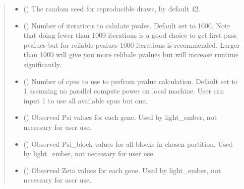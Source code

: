 \documentclass[letterpaper,10pt,english]{sphinxmanual}
\begin{document}
\begin{fulllineitems}
\begin{quote}
\begin{description}
\begin{itemize}
\item {} 
\sphinxAtStartPar
{} (\sphinxstyleliteralemphasis{\sphinxupquote{, }}) \textendash{} The random seed for reproducible draws, by default 42.

\item {} 
\sphinxAtStartPar
{} (\sphinxstyleliteralemphasis{\sphinxupquote{, }}) \textendash{} Number of iterations to calulate p\sphinxhyphen{}vales. Default set to 1000.
Note that doing fewer than 1000 iterations is a good choice to get first pass p\sphinxhyphen{}values
but for reliable p\sphinxhyphen{}values 1000 iterations is recommended.
Larger than 1000 will give you more relibale p\sphinxhyphen{}values but will increase runtime significantly.

\item {} 
\sphinxAtStartPar
{} (\sphinxstyleliteralemphasis{\sphinxupquote{, }}) \textendash{} Number of cpus to use to perfrom p\sphinxhyphen{}value calculation.
Default set to 1 assuming no parallel compute power on local machine.
User can input \sphinxhyphen{}1 to use all available cpus but one.

\item {} 
\sphinxAtStartPar
{} (\sphinxstyleliteralemphasis{\sphinxupquote{, }}) \textendash{} Observed Psi values for each gene.
Used by light\_ember, not necessary for user use.

\item {} 
\sphinxAtStartPar
{} (\sphinxstyleliteralemphasis{\sphinxupquote{, }}) \textendash{} Observed Psi\_block values for all blocks in chosen partition.
Used by light\_ember, not necessary for user use.

\item {} 
\sphinxAtStartPar
{} (\sphinxstyleliteralemphasis{\sphinxupquote{, }}) \textendash{} Observed Zeta values for each gene.
Used by light\_ember, not necessary for user use.


\end{itemize}
\end{description}
\end{quote}
\end{fulllineitems}
\end{document}
